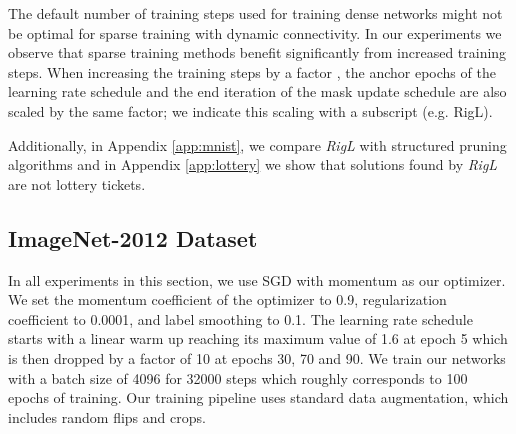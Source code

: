 \documentclass{article}
\begin{document}
The default number of training steps used for training dense networks might not be optimal for sparse training with dynamic connectivity. In our experiments we observe that sparse training methods benefit significantly from increased training steps. When increasing the training steps by a factor , the anchor epochs of the learning rate schedule and the end iteration of the mask update schedule are also scaled by the same factor; we indicate this scaling with a subscript (e.g. RigL).

Additionally, in Appendix \ref{app:mnist}, we compare \textit{RigL} with structured pruning algorithms and in Appendix \ref{app:lottery} we show that solutions found by \textit{RigL} are not lottery tickets.
\subsection{ImageNet-2012 Dataset}
In all experiments in this section, we use SGD with momentum as our optimizer. We set the momentum coefficient of the optimizer to 0.9,  regularization coefficient to 0.0001, and label smoothing \citep{labelsmooth} to 0.1. The learning rate schedule starts with a linear warm up reaching its maximum value of 1.6 at epoch 5 which is then dropped by a factor of 10 at epochs 30, 70 and 90. We train our networks with a batch size of 4096 for 32000 steps which roughly corresponds to 100 epochs of training. Our training pipeline uses standard data augmentation, which includes random flips and crops.
\end{document}
